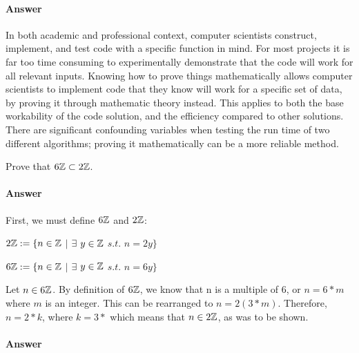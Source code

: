 \documentclass{article}
\begin{document}
\paragraph{Answer}

In both academic and professional context, computer scientists construct, implement, and test code with a specific function in mind. For most projects it is far too time consuming to experimentally demonstrate that the code will work for all relevant inputs. Knowing how to prove things mathematically allows computer scientists to implement code that they know will work for a specific set of data, by proving it through mathematic theory instead. This applies to both the base workability of the code solution, and the efficiency compared to other solutions. There are significant confounding variables when testing the run time of two different algorithms; proving it mathematically can be a more reliable method.



Prove that $6{\mathbb Z} \subset 2{\mathbb Z}$.

\paragraph{Answer} First, we must define $6{\mathbb Z}$ and $2{\mathbb Z}$:

$2{\mathbb Z} := \{ n \in {\mathbb Z} $ $|$ $ \exists $ $y \in {\mathbb Z} $ $s.t.$ $n=2y \}$

$6{\mathbb Z} := \{ n \in {\mathbb Z} $ $|$ $ \exists $ $y \in {\mathbb Z} $ $s.t.$ $n=6y \}$

Let $n \in 6{\mathbb Z}$.  By definition of $6{\mathbb Z}$, we know that n is a multiple of 6, or $n = 6*m$ where $m$ is an integer. This can be rearranged to $n = 2(3*m)$. Therefore, $n=2*k$, where $k=3*$ which means that $n\in 2{\mathbb Z}$, as was to be shown.





\paragraph{Answer}
\end{document}
